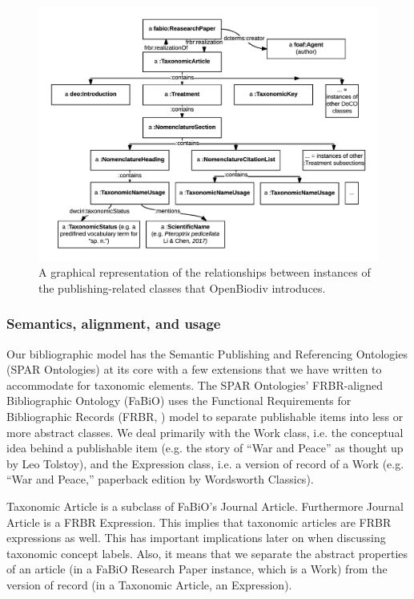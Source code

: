 \begin{figure}[h!]
	\centering
	\includegraphics[width=\textwidth]{Figures/taxonomic-article-diagram}
	\decoRule
  \caption[Taxonomic article diagram.]{A graphical representation of the relationships between instances of the publishing-related classes that OpenBiodiv introduces.}
  \label{taxonomic-article-diagram}
\end{figure}

\subsubsection{Semantics, alignment, and usage}

Our bibliographic model has the Semantic Publishing and Referencing Ontologies (SPAR Ontologies) at its core with a few extensions that we have written to accommodate for taxonomic elements. The SPAR Ontologies' FRBR-aligned Bibliographic Ontology (FaBiO) uses the Functional Requirements for Bibliographic Records (FRBR, \cite{tillett_conceptual_2003}) model to separate publishable items into less or more abstract classes. We deal primarily with the Work class, i.e. the conceptual idea behind a publishable item (e.g. the story of ``War and Peace'' as thought up by Leo Tolstoy), and the Expression class, i.e. a version of record of a Work (e.g. ``War and Peace,'' paperback edition by Wordsworth Classics).

Taxonomic Article is a subclass of FaBiO's Journal Article. Furthermore Journal Article is a FRBR Expression. This implies that taxonomic articles are FRBR expressions as well. This has important implications later on when discussing taxonomic concept labels. Also, it means that we separate the abstract properties of an article (in a FaBiO Research Paper instance, which is a Work) from the version of record (in a Taxonomic Article, an Expression).

